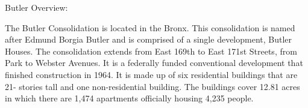 Butler Overview:     

   

The Butler Consolidation is located in the Bronx. This consolidation is named after Edmund Borgia Butler and is comprised of a single development, Butler Houses. The consolidation extends from East 169th to East 171st Streets, from Park to Webster Avenues. It is a federally funded conventional development that finished construction in 1964. It is made up of six residential buildings that are 21- stories tall and one non-residential building. The buildings cover 12.81 acres in which there are 1,474 apartments officially housing 4,235 people.